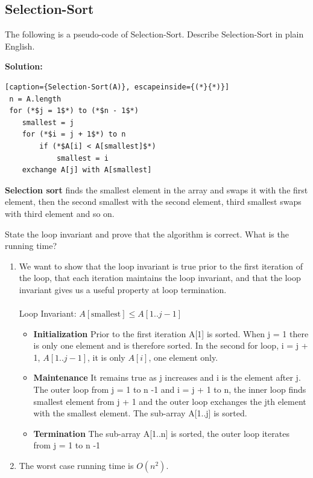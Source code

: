 \documentclass[11pt,fleqn]{book}
\begin{document}
\subsection{Selection-Sort}
\begin{example}
 The following is a pseudo-code of Selection-Sort.  Describe Selection-Sort in plain English.
\end{example}
\textbf{Solution:} 
 \begin{lstlisting}[caption={Selection-Sort(A)}, escapeinside={(*}{*)}]
 n = A.length 
 for (*$j = 1$*) to (*$n - 1$*)
    smallest = j 
    for (*$i = j + 1$*) to n 
        if (*$A[i] < A[smallest]$*)
            smallest = i 
    exchange A[j] with A[smallest]
\end{lstlisting} 
\begin{definition}
\textbf{ Selection sort} finds the smallest element in the array and swaps it with the first element, then the second smallest with the second element, third smallest swaps with third element and so on. 
\end{definition}
\begin{example}
State the loop invariant and prove that the algorithm is correct. What is the running time?
\end{example}
\begin{enumerate}
    \item We want to show that the loop invariant is true prior to the first iteration of the loop, that each iteration maintains the loop invariant, and that the loop invariant gives us a useful property at loop termination.\\ \\
        Loop Invariant: $A[\text{smallest}] \leq A[1..j-1]$
        \begin{itemize}
            \item \textbf{Initialization} Prior to the first iteration A[1] is sorted. When j = 1 there is only one element and is therefore sorted. In the second for loop, i = j + 1, $A[1..j-1]$, it is only $A[i]$, one element only. 
            \item \textbf{Maintenance} It remains true as j increases and i is the element after j. The outer loop from j = 1 to n -1 and i = j + 1 to n, the inner loop finds smallest element from j + 1 and the outer loop exchanges the jth element with the smallest element. The sub-array A[1..j] is sorted. 
            \item \textbf{Termination} The sub-array A[1..n] is sorted, the outer loop iterates from j = 1 to n -1 
        \end{itemize}
        \item The worst case running time is $O(n^2)$.
\end{enumerate}
\end{document}
